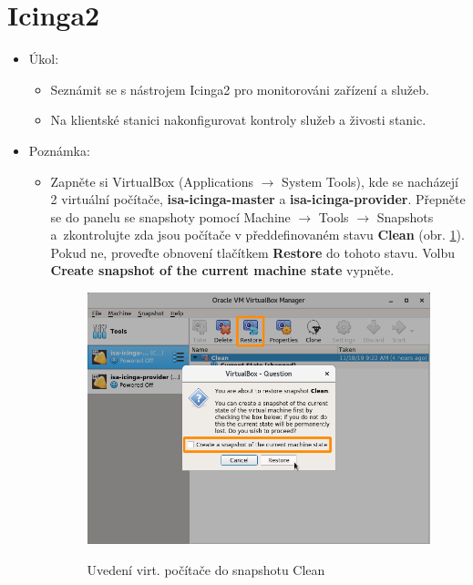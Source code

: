 \section{Icinga2}
  \begin{itemize}
    \item Úkol: 
    \begin{itemize}
      \item Seznámit se s nástrojem Icinga2 pro monitorováni zařízení a služeb.
      \item Na klientské stanici nakonfigurovat kontroly služeb a živosti stanic.  
    \end{itemize}
    \item Poznámka:
        \begin{itemize}
	        \item Zapněte si VirtualBox (Applications $\rightarrow$ System Tools), kde se nacházejí 2 virtuální počítače, {\bf isa-icinga-master} a {\bf isa-icinga-provider}. Přepněte se do panelu se snapshoty pomocí Machine $\rightarrow$ Tools $\rightarrow$ Snapshots a~zkontrolujte zda jsou počítače v předdefinovaném stavu {\bf Clean} (obr. \ref{fig:revert}). Pokud ne, proveďte obnovení tlačítkem {\bf Restore} do tohoto stavu. Volbu {\bf Create snapshot of the current machine state} vypněte.
            
            \begin{figure}[!ht]
            	\caption{Uvedení virt. počítače do snapshotu Clean}
            	\centering
            	\includegraphics[width=0.67\linewidth]{files/vbox-revert.png}
            	\label{fig:revert}
            \end{figure}
            

\end{itemize}
\end{itemize}
